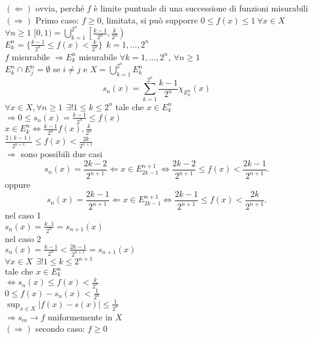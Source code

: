 \documentclass[12px]{article}
\begin{document}
\begin{dimo}
	$ ( \Leftarrow)$ ovvia, perché $f$ è limite puntuale di una successione di funzioni misurabili\\[10px]
	$ ( \Rightarrow )$ Primo caso: $f\geq 0$, limitata, si può supporre  $0\leq f(x)\leq 1\ \forall x\in X$\\

	$\forall n\geq 1$ $[0,1) = \bigcup_{k=1}^{2^n}\left[ \frac{k-1}{2^n},\frac {k}{2^n} \right) $\\
	$ E_k^n = \{\frac{k-1}{2^n}\leq f(x) < \frac {k}{2^n}\}\ \ k = 1,\ldots,2^n$\\
	$f$ misurabile  $ \Rightarrow E_k^n$ misurabile $\forall k = 1,\ldots, 2^n, \ \forall n\geq 1$\\
	 $E_k^ n\cap E_j^n = \emptyset$ se  $i\neq j$ e $X = \bigcup^{2^n}_{k=1}E_k^n$\\ 
 \[s_n(x) = \sum^{2^n}_{k=1}\frac{k-1}{2^n}\chi_{E_k^n}(x)\]
 $\forall x\in X, \forall n\geq 1\ \ \exists ! 1\leq k\leq 2^n$ tale che $x\in E_k^n$\\
 $ \Rightarrow  0\leq s_n(x) = \frac{k-1}{2^n}\leq f(x)$ \\
 $x\in E_k^n \Leftrightarrow \frac{k-1}{2^n} f(x) , \frac { k}{2^n}$\\
$\frac{2(k-1)}{2^{n+1}}\leq f(x) < \frac { 2k}{2^{n+1}}$\\
$ \Rightarrow $ sono possibili due casi
\[
	s_n(x) = \frac{ 2k-2}{2^{n+1}}\Leftarrow x\in E_{2k-1}^{n+1}\Leftrightarrow	\frac{2k - 2}{2^{n+1}}\leq f(x) < \frac {2k-1}{2^{n+1}}
.\] 
oppure \[
	s_n(x) = \frac{ 2k-1}{2^{n+1}}\Leftarrow x\in E_{2k-1}^{n+1}\Leftrightarrow\frac{2k-1}{2^{n+1}}\leq f(x) < \frac{2k}{2^{n+1}}
.\] 
nel caso 1\\
$s_n(x) = \frac{k_-1}{2^n} = s_{n+1}(x)$\\
nel caso 2\\
$s_n(x) = \frac {k-1}{2^n} < \frac{2k-1}{2^{n+1}}=s_{n+1}(x)$\\
$\forall x\in X\ \ \exists ! 1\leq k\leq 2^{n+1}$\\
tale che  $x\in E_k^n$\\
$ \Leftrightarrow s_n(x)\leq f(x) < \frac{k}{2^n}$\\
$0\leq f(x) - s_n(x) < \frac 1 {2^n}$\\
$\sup_{x\in X}|f(x) - s(x)| \leq \frac{1}{2^n} $\\
$ \Rightarrow s_m \rightarrow f$ uniformemente in $X$\\[10px]
  $ (\Rightarrow )$ secondo caso: $f\geq 0$\\

\end{dimo}
\end{document}
